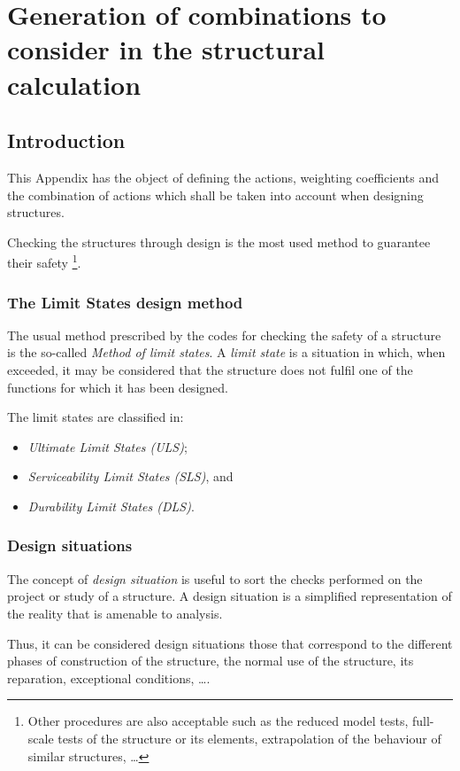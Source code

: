 \chapter{Generation of combinations to consider in the structural calculation}

\section{Introduction}
This Appendix has the object of defining the actions, weighting coefficients and the combination of actions which shall be taken into account when designing structures.

Checking the structures through design is the most used method to guarantee their safety \footnote{Other procedures are also acceptable such as the reduced model tests, full-scale tests of the structure or its elements, extrapolation of the behaviour of similar structures, \ldots}.

\subsection{The Limit States design method} \label{limit_states_introd}
The usual method prescribed by the codes for checking the safety of a structure is the so-called \emph{Method of limit states}. A \emph{limit state} is a situation in which, when exceeded, it may be considered that the structure does not fulfil one of the functions for which it has been designed.

The limit states are classified in:
\begin{itemize}
\item \emph{Ultimate Limit States (ULS)};
\item \emph{Serviceability Limit States (SLS)}, and
\item \emph{Durability Limit States (DLS)}.
\end{itemize}

\subsection{Design situations}
The concept of \emph{design situation} is useful to sort the checks performed on the project or study of a structure. A design situation is a simplified representation of the reality that is amenable to analysis.

Thus, it can be considered design situations those that correspond to the different phases of construction of the structure, the normal use of the structure, its reparation, exceptional conditions, \ldots. 

